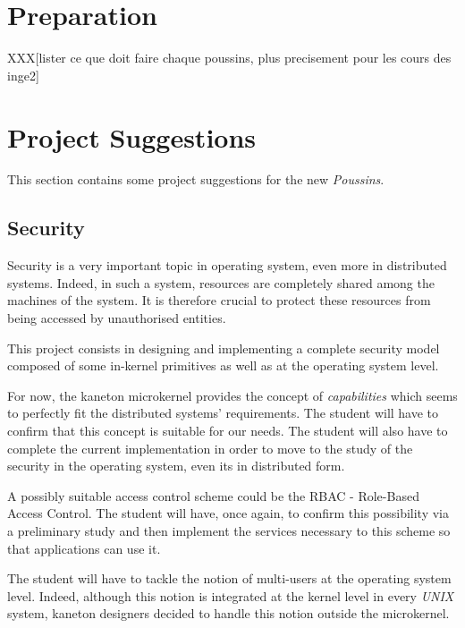 \begin{multicols}{2}
%
%

\section{Preparation}

XXX[lister ce que doit faire chaque poussins, plus precisement pour les cours
    des inge2]

%
%

\section{Project Suggestions}

This section contains some project suggestions for the new \textit{Poussins}.

%
%

\subsection{Security}

Security is a very important topic in operating system, even more in
distributed systems. Indeed, in such a system, resources are completely
shared among the machines of the system. It is therefore crucial to protect
these resources from being accessed by unauthorised entities.

This project consists in designing and implementing a complete security
model composed of some in-kernel primitives as well as at the operating
system level.

For now, the kaneton microkernel provides the concept of \textit{capabilities}
which seems to perfectly fit the distributed systems' requirements. The student
will have to confirm that this concept is suitable for our needs. The student
will also have to complete the current implementation in order to move to
the study of the security in the operating system, even its in distributed
form.

A possibly suitable access control scheme could be the RBAC - Role-Based
Access Control. The student will have, once again, to confirm this
possibility via a preliminary study and then implement the services
necessary to this scheme so that applications can use it.

The student will have to tackle the notion of multi-users at the operating
system level. Indeed, although this notion is integrated at the kernel
level in every \textit{UNIX} system, kaneton designers decided to handle this
notion outside the microkernel.


\end{multicols}
